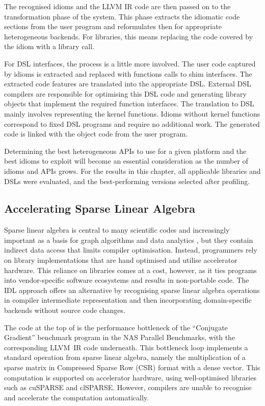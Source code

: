     The recognised idioms and the LLVM IR code are then passed on to the
    transformation phase of the system.
    This phase extracts the idiomatic code sections from the user program and
    reformulates then for appropriate heterogeneous backends.
    For libraries, this means replacing the code covered by the idiom with a
    library call. 

    For DSL interfaces, the process is a little more involved.
    The user code captured by idioms is extracted and replaced with functions
    calls to shim interfaces.
    The extracted code features are translated into the appropriate DSL.
    External DSL compilers are responsible for optimising this DSL code and
    generating library objects that implement the required function interfaces.
    The translation to DSL mainly involves representing the kernel functions.
    Idioms without kernel functions correspond to fixed DSL programs and
    require no additional work.
    The generated code is linked with the object code from the user program.

    Determining the best heterogeneous APIs to use for a given platform and the
    best idioms to exploit will become an essential consideration as the number
    of idioms and APIs grows.
    For the results in this chapter, all applicable libraries and DSLs were
    evaluated, and the best-performing versions selected after profiling.

\subsection{Accelerating Sparse Linear Algebra}

    Sparse linear algebra is central to many scientific codes and increasingly
    important as a basis for graph algorithms and data analytics
    \cite{Kepner2015GraphsMA}, but they contain indirect data access that limits
    compiler optimisation.
    Instead, programmers rely on library implementations that are hand optimised
    and utilise accelerator hardware.
    This reliance on libraries comes at a cost, however, as it ties programs
    into vendor-specific software ecosystems and results in non-portable code.
    The IDL approach offers an alternative by recognising sparse linear algebra
    operations in compiler intermediate representation and then incorporating
    domain-specific backends without source code changes.

    The code at the top of  is the performance
    bottleneck of the ``Conjugate Gradient'' benchmark program in the NAS
    Parallel Benchmarks, with the corresponding LLVM~IR code underneath.
    This bottleneck loop implements a standard operation from sparse linear
    algebra, namely the multiplication of a sparse matrix in
    Compressed Sparse Row (CSR) format with a dense vector.
    This computation is supported on accelerator hardware, using well-optimised
    libraries such as cuSPARSE and clSPARSE.
    However, compilers are unable to recognise and accelerate the computation
    automatically.

